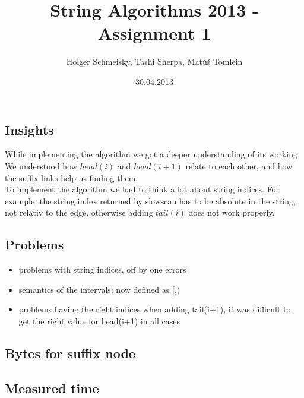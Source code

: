 \documentclass[a4paper,10pt]{article}
\title{String Algorithms 2013 - Assignment 1}
\author{Holger Schmeisky, Tashi Sherpa, Matúš Tomlein}
\date{30.04.2013}
\begin{document}
\maketitle

\subsection*{Insights}
While implementing the algorithm we got a deeper understanding of its working. We understood how $head(i)$ and $head(i+1)$ relate to each other, and how the suffix links help us finding them.\\
To implement the algorithm we had to think a lot about string indices. For example, the string index returned by slowscan has to be absolute in the string, not relativ to the edge, otherwise adding $tail(i)$ does not work properly.

\subsection*{Problems}
\begin{itemize}
  \item problems with string indices, off by one errors
  \item semantics of the intervals: now defined as [,)
  \item problems having the right indices when adding tail(i+1), it was difficult to get the right value for head(i+1) in all cases
\end{itemize}

\subsection*{Bytes for suffix node}

\subsection*{Measured time}
\end{document}
